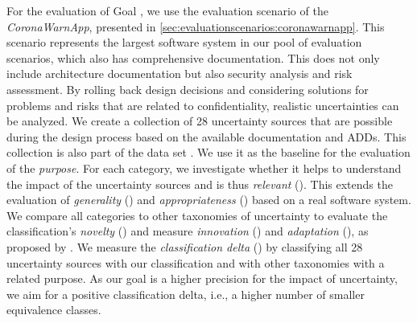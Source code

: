 For the evaluation of Goal , we use the evaluation scenario of the \emph{CoronaWarnApp}, presented in \autoref{sec:evaluationscenarios:coronawarnapp}.
This scenario represents the largest software system in our pool of evaluation scenarios, which also has comprehensive documentation.
This does not only include architecture documentation but also security analysis and risk assessment.
By rolling back design decisions and considering solutions for problems and risks that are related to confidentiality, realistic uncertainties can be analyzed.
We create a collection of 28 uncertainty sources that are possible during the design process based on the available documentation and \acfp{ADD}.
This collection is also part of the data set \cite{dataset}.
We use it as the baseline for the evaluation of the \emph{purpose}.
For each category, we investigate whether it helps to understand the impact of the uncertainty sources and is thus \emph{relevant} ().
This extends the evaluation of \emph{generality} () and \emph{appropriateness} () based on a real software system.
We compare all categories to other taxonomies \cite{bures_capturing_2020,esfahani_uncertainty_2013,mahdavi-hezavehi_classification_2017,perez-palacin_uncertainties_2014,ramirez_taxonomy_2012,walker_defining_2003} of uncertainty to evaluate the classification's \emph{novelty} () and measure \emph{innovation} () and \emph{adaptation} (), as proposed by \textcite{kaplan_introducing_2022}.
We measure the \emph{classification delta} () by classifying all 28 uncertainty sources with our classification and with other taxonomies \cite{bures_capturing_2020,mahdavi-hezavehi_classification_2017,perez-palacin_uncertainties_2014} with a related purpose.
As our goal is a higher precision for the impact of uncertainty, we aim for a positive classification delta, i.e., a higher number of smaller equivalence classes.

